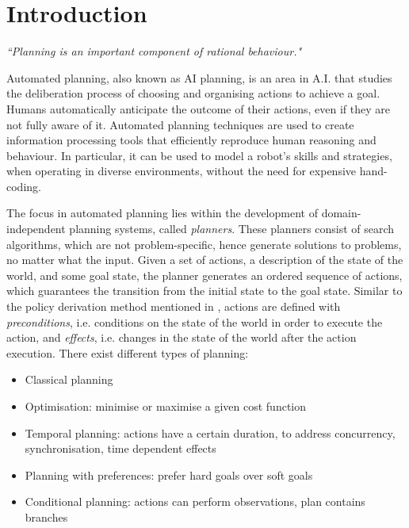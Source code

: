 \section{Introduction}
\begin{center}
\textit{``Planning is an important component of rational behaviour." }\\ \cite{ghallab2004automated}
\end{center}


Automated planning, also known as AI planning, is an area in A.I. that studies the deliberation process of choosing and organising actions to achieve a goal. 
Humans automatically anticipate the outcome of their actions, even if they are not fully aware of it. 
Automated planning techniques are used to create information processing tools that efficiently reproduce human reasoning and behaviour. 
In particular, it can be used to model a robot's skills and strategies, when operating in diverse environments, without the need for expensive hand-coding.

The focus in automated planning lies within the development of {domain-independent} planning systems, called \textit{planners}.
These planners consist of search algorithms, which are not problem-specific, hence generate solutions to problems, no matter what the input. 
Given a set of actions, a description of the state of the world, and some goal state, the planner generates an ordered sequence of actions, which guarantees the transition from the initial state to the goal state. 
Similar to the policy derivation method mentioned in , actions are defined with \textit{preconditions}, i.e. conditions on the state of the world in order to execute the action, and \textit{effects}, i.e. changes in the state of the world after the action execution. 
There exist different types of planning:
\begin{itemize}
    \item Classical planning
    \item Optimisation: minimise or maximise a given cost function
    \item Temporal planning: actions have a certain duration, to address concurrency, synchronisation, time dependent effects
    \item Planning with preferences: prefer hard goals over soft goals
    \item Conditional planning: actions can perform observations, plan contains branches
\end{itemize}

